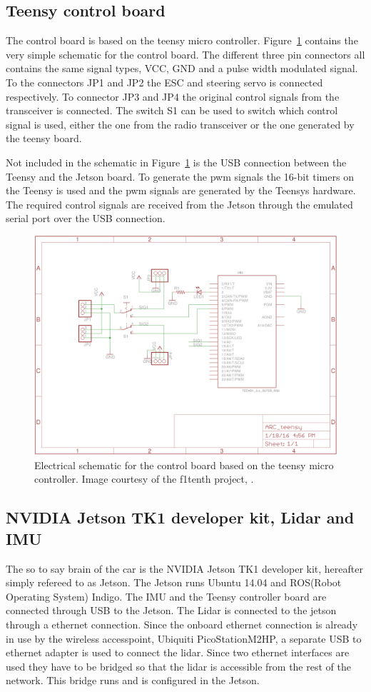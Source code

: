 \documentclass{LTHtwocol} %
\newcommand{\figref}[1]{Figure~\ref{#1}}
\begin{document}
\subsection{Teensy control board}
The control board is based on the teensy micro controller. \figref{fig:teensy_schematic} contains the very simple schematic for the control board. The different three pin connectors all contains the same signal types, VCC, GND and a pulse width modulated signal. To the connectors JP1 and JP2 the ESC and steering servo is connected respectively. To connector JP3 and JP4 the original control signals from the transceiver is connected. The switch S1 can be used to switch which control signal is used, either the one from the radio transceiver or the one generated by the teensy board.

Not included in the schematic in \figref{fig:teensy_schematic} is the USB connection between the Teensy and the Jetson board. To generate the pwm signals the 16-bit timers on the Teensy is used and the pwm signals are generated by the Teensys hardware. The required control signals are received from the Jetson through the emulated serial port over the USB connection.

\begin{figure}[b]
	\centering
	\includegraphics[width=0.7\columnwidth]{images/teensy_schematic}
	\caption{Electrical schematic for the control board based on the teensy micro controller. Image courtesy of the f1tenth project, \cite{teensy_schematic}.}
	\label{fig:teensy_schematic}
\end{figure}

\subsection{NVIDIA Jetson TK1 developer kit, Lidar and IMU}
The so to say brain of the car is the NVIDIA Jetson TK1 developer kit, hereafter simply refereed to as Jetson. The Jetson runs Ubuntu 14.04 and ROS(Robot Operating System) Indigo. The IMU and the Teensy controller board are connected through USB to the Jetson. The Lidar is connected to the jetson through a ethernet connection. Since the onboard ethernet connection is already in use by the wireless accesspoint, Ubiquiti PicoStationM2HP, a separate USB to ethernet adapter is used to connect the lidar. Since two ethernet interfaces are used they have to be bridged so that the lidar is accessible from the rest of the network. This bridge runs and is configured in the Jetson.
\end{document}
